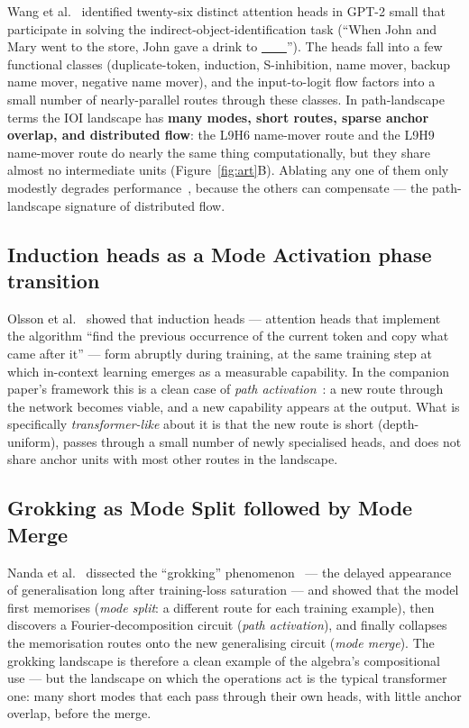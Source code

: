\documentclass[11pt,a4paper]{article}
\begin{document}
Wang et al.~\cite{wang2022interpretability} identified twenty-six
distinct attention heads in GPT-2 small that participate in solving
the indirect-object-identification task (``When John and Mary went
to the store, John gave a drink to \underline{\ \ \ \ }''). The heads
fall into a few functional classes (duplicate-token, induction,
S-inhibition, name mover, backup name mover, negative name mover), and
the input-to-logit flow factors into a small number of nearly-parallel
routes through these classes. In path-landscape terms the IOI
landscape has \textbf{many modes, short routes, sparse anchor
overlap, and distributed flow}: the L9H6 name-mover route and the
L9H9 name-mover route do nearly the same thing computationally, but
they share almost no intermediate units (Figure~\ref{fig:art}B).
Ablating any one of them only modestly degrades
performance~\cite{wang2022interpretability,mcgrath2023hydra}, because
the others can compensate --- the path-landscape signature of
distributed flow.

\subsection{Induction heads as a Mode Activation phase transition}

Olsson et al.~\cite{olsson2022induction} showed that induction heads
--- attention heads that implement the algorithm ``find the previous
occurrence of the current token and copy what came after it'' ---
form abruptly during training, at the same training step at which
in-context learning emerges as a measurable capability. In the
companion paper's framework this is a clean case of \emph{path
activation}~\cite{companion}: a new route through the network
becomes viable, and a new capability appears at the output. What is
specifically \emph{transformer-like} about it is that the new route
is short (depth-uniform), passes through a small number of newly
specialised heads, and does not share anchor units with most other
routes in the landscape.

\subsection{Grokking as Mode Split followed by Mode Merge}

Nanda et al.~\cite{nanda2023grokking} dissected the ``grokking''
phenomenon~\cite{power2022grokking} --- the delayed appearance of
generalisation long after training-loss saturation --- and showed
that the model first memorises (\emph{mode split}: a different route
for each training example), then discovers a Fourier-decomposition
circuit (\emph{path activation}), and finally collapses the
memorisation routes onto the new generalising circuit (\emph{mode
merge}). The grokking landscape is therefore a clean example of the
algebra's compositional use --- but the landscape on which the
operations act is the typical transformer one: many short modes that
each pass through their own heads, with little anchor overlap, before
the merge.
\end{document}
